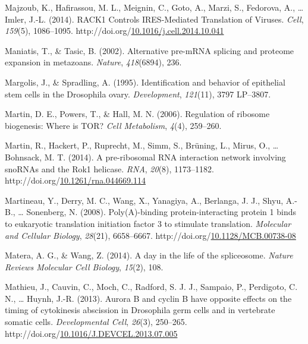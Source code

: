 \documentclass[12pt,oneside]{reedthesis}
\newlength{\cslhangindent}
\newenvironment{CSLReferences}[2] %
 {%
  \setlength{\parindent}{0pt}
  \ifodd #1 \everypar{\setlength{\hangindent}{\cslhangindent}}\ignorespaces\fi
  \ifnum #2 > 0
  \setlength{\parskip}{#2\baselineskip}
  \fi
 }%
 {}
\begin{document}
\begin{CSLReferences}{1}{0}
\leavevmode{}%
Majzoub, K., Hafirassou, M. L., Meignin, C., Goto, A., Marzi, S., Fedorova, A., \ldots{} Imler, J.-L. (2014). {RACK1 Controls IRES-Mediated Translation} of {Viruses}. \emph{Cell}, \emph{159}(5), 1086--1095. http://doi.org/\href{https://doi.org/10.1016/j.cell.2014.10.041}{10.1016/j.cell.2014.10.041}

\leavevmode{}%
Maniatis, T., \& Tasic, B. (2002). Alternative pre-{mRNA} splicing and proteome expansion in metazoans. \emph{Nature}, \emph{418}(6894), 236.

\leavevmode{}%
Margolis, J., \& Spradling, A. (1995). Identification and behavior of epithelial stem cells in the {Drosophila} ovary. \emph{Development}, \emph{121}(11), 3797 LP--3807.

\leavevmode{}%
Martin, D. E., Powers, T., \& Hall, M. N. (2006). Regulation of ribosome biogenesis: Where is {TOR}? \emph{Cell Metabolism}, \emph{4}(4), 259--260.

\leavevmode{}%
Martin, R., Hackert, P., Ruprecht, M., Simm, S., Brüning, L., Mirus, O., \ldots{} Bohnsack, M. T. (2014). A pre-ribosomal {RNA} interaction network involving {snoRNAs} and the {Rok1} helicase. \emph{RNA}, \emph{20}(8), 1173--1182. http://doi.org/\href{https://doi.org/10.1261/rna.044669.114}{10.1261/rna.044669.114}

\leavevmode{}%
Martineau, Y., Derry, M. C., Wang, X., Yanagiya, A., Berlanga, J. J., Shyu, A.-B., \ldots{} Sonenberg, N. (2008). Poly({A})-binding protein-interacting protein 1 binds to eukaryotic translation initiation factor 3 to stimulate translation. \emph{Molecular and Cellular Biology}, \emph{28}(21), 6658--6667. http://doi.org/\href{https://doi.org/10.1128/MCB.00738-08}{10.1128/MCB.00738-08}

\leavevmode{}%
Matera, A. G., \& Wang, Z. (2014). A day in the life of the spliceosome. \emph{Nature Reviews Molecular Cell Biology}, \emph{15}(2), 108.

\leavevmode{}%
Mathieu, J., Cauvin, C., Moch, C., Radford, S. J. J., Sampaio, P., Perdigoto, C. N., \ldots{} Huynh, J.-R. (2013). Aurora {B} and cyclin {B} have opposite effects on the timing of cytokinesis abscission in {Drosophila} germ cells and in vertebrate somatic cells. \emph{Developmental Cell}, \emph{26}(3), 250--265. http://doi.org/\href{https://doi.org/10.1016/J.DEVCEL.2013.07.005}{10.1016/J.DEVCEL.2013.07.005}


\end{CSLReferences}
\end{document}

